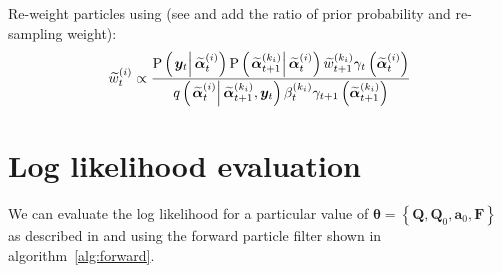 \documentclass[9pt, notitlepage]{article}
\newcommand\StateX{\Statex\hspace{\algorithmicindent}}
\renewcommand{\vec}[1]{\bm{#1}}
\newcommand{\mat}[1]{\mathbf{#1}}
\newcommand{\Lbrace}[1]{\left\{ #1\right\}}
\newcommand{\Lparen}[1]{\left( #1\right)}
\newcommand{\Cond}[2]{\left. #1 \vphantom{#2} \right\vert  #2}
\newcommand{\Prob}{\text{P}}
\newcommand{\optor}[2]{#1\Lparen{#2}}
\newcommand{\optorC}[3]{\optor{#1}{\Cond{#2}{#3}}}
\newcommand{\propC}[2]{\optorC{\Prob}{#1}{#2}}
\newcommand{\IDC}[2]{\optorC{q}{#1}{#2}}
\newcommand{\partic}[3]{#1_{#2}^{\Lparen{#3}}}
\newcommand{\particB}[3]{\widetilde{#1}_{#2}^{\Lparen{#3}}}
\begin{document}
\begin{algorithm}[H]
\begin{algorithmic}[1]
\EndProcedure
%
\State Re-weight particles using {\footnotesize (see \citet[page 72]{briers10} and add the ratio of prior probability and re-sampling weight)}:
\StateX \begin{equation}\label{eqn:backwardWeight}
	\particB{w}{t}{i} \propto \frac{
		\propC{\vec{y}_t}{\particB{\vec{\alpha}}{t}{i}}
		\propC{\particB{\vec{\alpha}}{t + 1}{k_i}}{\particB{\vec{\alpha}}{t}{i}}
		\particB{w}{t + 1}{k_i}
		\gamma_t\Lparen{\particB{\vec{\alpha}}{t}{i}}
	}{ %
		\IDC{\particB{\vec{\alpha}}{t}{i}}{\particB{\vec{\alpha}}{t + 1}{k_i}, \vec{y}_t}
		\partic{\beta}{t}{k_i}
		\gamma_{t + 1}\Lparen{\particB{\vec{\alpha}}{t + 1}{k_i}}
	}
\end{equation}
\EndProcedure
\EndFor
\end{algorithmic}
\end{algorithm}

\newpage

\section{Log likelihood evaluation}
We can evaluate the log likelihood for a particular value of $\vec{\theta} = \Lbrace{\mat{Q}, \mat{Q}_0, \vec{a}_0, \mat{F}}$ as described in \citet[page 5]{doucet09} and \citet[page 193]{malik11} using the forward particle filter shown in algorithm~\ref{alg:forward}.
\end{document}
